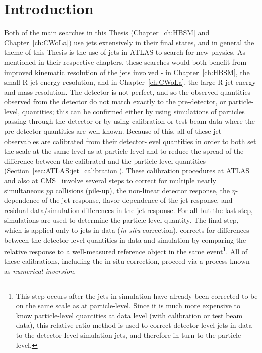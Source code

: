 \section{Introduction}
\label{sec:NI:intro}
Both of the main searches in this Thesis (Chapter~\ref{ch:HBSM} and Chapter~\ref{ch:CWoLa}) use jets extensively in their final states, and in general the theme of this Thesis is the use of jets in ATLAS to search for new physics.
As mentioned in their respective chapters, these searches would both benefit from improved kinematic resolution of the jets involved - in Chapter~\ref{ch:HBSM}, the small-R jet energy resolution, and in Chapter~\ref{ch:CWoLa}, the large-R jet energy and mass resolution.
The detector is not perfect, and so the observed quantities observed from the detector do not match exactly to the pre-detector, or particle-level, quantities;
this can be confirmed either by using simulations of particles passing through the detector or by using calibration or test beam data where the pre-detector quantities are well-known.
Because of this, all of these jet observables are calibrated from their detector-level quantities in order to both set the scale at the same level as at particle-level and to reduce the spread of the difference between the calibrated and the particle-level quantities~\cite{Schwartzman:2015ada} (Section~\ref{sec:ATLAS:jet_calibration}).
These calibration procedures at ATLAS~\cite{PERF-2016-04,Aad:2011he} and also at CMS~\cite{Chatrchyan:2011ds,Khachatryan:2016kdb} involve several steps to correct for multiple nearly simultaneous $pp$ collisions (pile-up), the non-linear detector response, the $\eta$-dependence of the jet response, flavor-dependence of the jet response, and residual data/simulation differences in the jet response.
For all but the last step, simulations are used to determine the particle-level quantity.
The final step, which is applied only to jets in data (\textit{in-situ} correction), corrects for differences between the detector-level quantities in data and simulation by comparing the relative response to a well-measured reference object in the same event\footnote{This step occurs after the jets in simulation have already been corrected to be on the same scale as at particle-level. Since it is much more expensive to know particle-level quantities at data level (with calibration or test beam data), this relative ratio method is used to correct detector-level jets in data to the detector-level simulation jets, and therefore in turn to the particle-level.}. 
All of these calibrations, including the in-situ correction, proceed via a process known as \textit{numerical inversion}.

